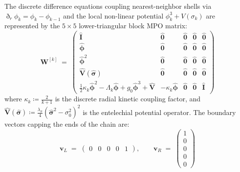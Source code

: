 \documentclass[
    12pt,
    a4paper,
    headings=normal,
    twoside=false,
    open=any,
    parskip=half
]{scrbook}
\newcommand{\ethop}{\eth}
\begin{document}
\begin{phystheorem}\label{thm:ch4_explicit_mpo_matrix}
The discrete difference equations coupling nearest-neighbor shells via $\ethop_r \phi_k = \phi_k - \phi_{k-1}$ and the local non-linear potential $\phi_k^3 + V(\sigma_k)$ are represented by the $5 \times 5$ lower-triangular block MPO matrix:
\begin{equation}
\mathbf{W}^{[k]} \;=\; \begin{pmatrix}
\hat{\mathbf{I}} & \hat{\mathbf{0}} & \hat{\mathbf{0}} & \hat{\mathbf{0}} & \hat{\mathbf{0}} \\
\hat{\boldsymbol{\phi}} & \hat{\mathbf{0}} & \hat{\mathbf{0}} & \hat{\mathbf{0}} & \hat{\mathbf{0}} \\
\hat{\boldsymbol{\phi}}^2 & \hat{\mathbf{0}} & \hat{\mathbf{0}} & \hat{\mathbf{0}} & \hat{\mathbf{0}} \\
\hat{\mathbf{V}}(\hat{\boldsymbol{\sigma}}) & \hat{\mathbf{0}} & \hat{\mathbf{0}} & \hat{\mathbf{0}} & \hat{\mathbf{0}} \\
\frac{1}{2}\kappa_k \hat{\boldsymbol{\phi}}^2 - \Lambda_k \hat{\boldsymbol{\phi}} + g_0 \hat{\boldsymbol{\phi}}^3 + \hat{\mathbf{V}} & -\kappa_k \hat{\boldsymbol{\phi}} & \hat{\mathbf{0}} & \hat{\mathbf{0}} & \hat{\mathbf{I}}
\end{pmatrix}
\label{eq:ch4_explicit_mpo_matrix}
\end{equation}
where $\kappa_k \coloneqq \frac{2}{k+1}$ is the discrete radial kinetic coupling factor, and $\hat{\mathbf{V}}(\hat{\boldsymbol{\sigma}}) \coloneqq \frac{\lambda_\sigma}{4}(\hat{\boldsymbol{\sigma}}^2 - \sigma_0^2)^2$ is the entelechial potential operator.
The boundary vectors capping the ends of the chain are:
\begin{equation}
\mathbf{v}_L \;=\; \begin{pmatrix} 0 & 0 & 0 & 0 & 1 \end{pmatrix}, \qquad \mathbf{v}_R \;=\; \begin{pmatrix} 1 \\ 0 \\ 0 \\ 0 \\ 0 \end{pmatrix}
\label{eq:ch4_mpo_boundary_vectors}
\end{equation}
\end{phystheorem}
\end{document}
